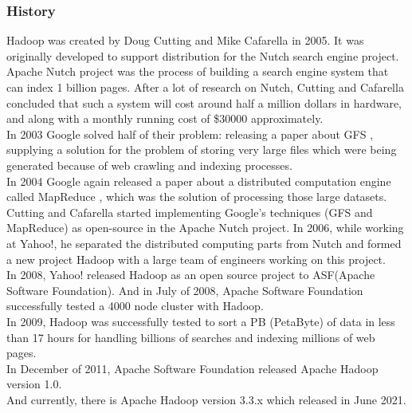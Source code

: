 \documentclass[\main/main.tex]{subfiles}
\begin{document}
\subsubsection{History}
Hadoop was created by Doug Cutting and Mike Cafarella in 2005. It was originally developed to support distribution for the Nutch search engine project. Apache Nutch project was the process of building a search engine system that can index 1 billion pages. After a lot of research on Nutch, Cutting and Cafarella concluded that such a system will cost around half a million dollars in hardware, and along with a monthly running cost of \$30000 approximately. \\
In 2003 Google solved half of their problem: releasing a paper about GFS \cite{GhemawatSanjay2003TheGF}, supplying a solution for the problem of storing very large files which were being generated because of web crawling and indexing processes. \\
In 2004 Google again released a paper about a distributed computation engine called MapReduce \cite{Dean2004MapReduceSD}, which was the solution of processing those large datasets. Cutting and Cafarella started implementing Google’s techniques (GFS and MapReduce) as open-source in the Apache Nutch project. 
In 2006, while working at Yahoo!, he separated the distributed computing parts from Nutch and formed a new project Hadoop with a large team of engineers working on this project. \\
In 2008, Yahoo! released Hadoop as an open source project to ASF(Apache Software Foundation). And in July of 2008, Apache Software Foundation successfully tested a 4000 node cluster with Hadoop. \\
In 2009, Hadoop was successfully tested to sort a PB (PetaByte) of data in less than 17 hours for handling billions of searches and indexing millions of web pages. \\
In December of 2011, Apache Software Foundation released Apache Hadoop version 1.0. \\
And currently, there is Apache Hadoop version 3.3.x which released in June 2021.
\end{document}
